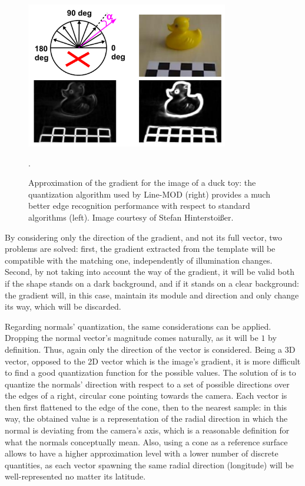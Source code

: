 \begin{figure}[htbp]
\centering
\includegraphics[height=2.5in]{./Graphics/duck-gradient}
\caption{Approximation of the gradient for the image of a duck toy:
  the quantization algorithm used by Line-MOD (right) provides a
  much better edge recognition performance with respect to standard
  algorithms (left). Image courtesy of Stefan Hinterstoi\ss er. \label{fig:duck-gradient}}.
\end{figure}

By considering only the direction of the gradient, and not its
full vector, two problems are solved: first, the gradient extracted
from the template will be compatible with the matching one,
independently of illumination changes. Second, by not taking into
account the way of the gradient, it will be valid both if the shape
stands on a dark background, and if it stands on a clear background:
the gradient will, in this case, maintain its module and direction and
only change its way, which will be discarded.

Regarding normals' quantization, the same considerations can be
applied. Dropping the normal vector's magnitude comes naturally, as
it will be $1$ by definition. Thus, again only the direction of the vector is
considered. Being a 3D vector, opposed to the 2D vector which is the
image's gradient, it is more difficult to find a good quantization function
for the possible values. The solution of \cite{linemod-paper} is to
quantize the normals' direction with respect to a set of possible
directions over the edges of a right, circular cone pointing towards
the camera. Each vector is then first flattened to the edge of the
cone, then to the nearest sample: in this way, the obtained value
is a representation of the radial direction in which the normal is deviating from the
camera's axis, which is a reasonable definition for what the normals
conceptually mean. Also, using a cone as a reference surface allows to
have a higher approximation level with a lower number of discrete
quantities, as each vector spawning the same radial direction
(longitude) will be well-represented no matter its latitude.

